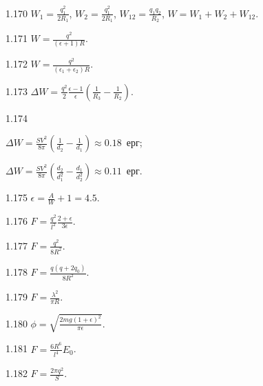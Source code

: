 \begin{Solution}{1.{170}}
	$W_1 = \frac{q_1^2}{2R_1}$, $W_2 = \frac{q_1^2}{2R_1}$, $W_{12} = \frac{q_1q_2}{R_2}$, $W = W_1 + W_2 + W_{12}$.
\end{Solution}
\begin{Solution}{1.{171}}
	$W = \frac{q^2}{(\epsilon + 1)R}$.
\end{Solution}
\begin{Solution}{1.{172}}
	$W = \frac{q^2}{(\epsilon_1 + \epsilon_2)R}$.
\end{Solution}
\begin{Solution}{1.{173}}
	$\Delta W = \frac{q^2}{2}\frac{\epsilon - 1}{\epsilon} \left( \frac{1}{R_3} - \frac{1}{R_2} \right) $.
\end{Solution}
\begin{Solution}{1.{174}}
	\begin{enumerate*}[label=\alph*)]
		\item $\Delta W = \frac{SV^2}{8\pi}\left( \frac{1}{d_2} - \frac{1}{d_1}\right) \approx 0.18$~ерг;
		\item $\Delta W = \frac{SV^2}{8\pi}\left( \frac{d_2}{d_1^2} - \frac{d_1}{d_2^2}\right) \approx 0.11$~ерг.
	\end{enumerate*}
\end{Solution}
\begin{Solution}{1.{175}}
	$\epsilon = \frac{A}{W} + 1 = 4.5$.
\end{Solution}
\begin{Solution}{1.{176}}
	$ F = \frac{q^2}{l^2} \frac{2 + \epsilon}{3\epsilon}.$
\end{Solution}
\begin{Solution}{1.{177}}
	$F = \frac{q^2}{8R^2}$.
\end{Solution}
\begin{Solution}{1.{178}}
	$F = \frac{q(q + 2q_0)}{8R^2}$.
\end{Solution}
\begin{Solution}{1.{179}}
	$F = \frac{\lambda^2}{\pi R}$.
\end{Solution}
\begin{Solution}{1.{180}}
	$\phi = \sqrt{\frac{2mg(1+\epsilon)^2}{\pi\epsilon}}$.
\end{Solution}
\begin{Solution}{1.{181}}
	$F = \frac{6R^6}{l^4} E_0$.
\end{Solution}
\begin{Solution}{1.{182}}
	$F = \frac{2\pi q^2}{S}$.
\end{Solution}

